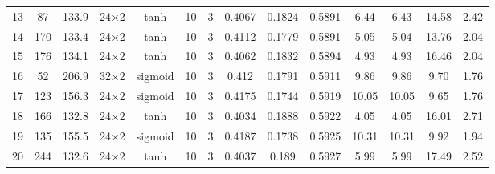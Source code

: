 \begin{tabular}{lcc cccc ccccccc}
  13 & 87 & 133.9 & 24$\times$2 & tanh & 10 & 3 & \num{0.4067} & \num{0.1824} & \num{0.5891} & 6.44 & 6.43 & 14.58 & 2.42 \\
  14 & 170 & 133.4 & 24$\times$2 & tanh & 10 & 3 & \num{0.4112} & \num{0.1779} & \num{0.5891} & 5.05 & 5.04 & 13.76 & 2.04 \\
  15 & 176 & 134.1 & 24$\times$2 & tanh & 10 & 3 & \num{0.4062} & \num{0.1832} & \num{0.5894} & 4.93 & 4.93 & 16.46 & 2.04 \\
  16 & 52 & 206.9 & 32$\times$2 & sigmoid & 10 & 3 & \num{0.412} & \num{0.1791} & \num{0.5911} & 9.86 & 9.86 & 9.70 & 1.76 \\
  17 & 123 & 156.3 & 24$\times$2 & sigmoid & 10 & 3 & \num{0.4175} & \num{0.1744} & \num{0.5919} & 10.05 & 10.05 & 9.65 & 1.76 \\
  18 & 166 & 132.8 & 24$\times$2 & tanh & 10 & 3 & \num{0.4034} & \num{0.1888} & \num{0.5922} & 4.05 & 4.05 & 16.01 & 2.71 \\
  19 & 135 & 155.5 & 24$\times$2 & sigmoid & 10 & 3 & \num{0.4187} & \num{0.1738} & \num{0.5925} & 10.31 & 10.31 & 9.92 & 1.94 \\
  20 & 244 & 132.6 & 24$\times$2 & tanh & 10 & 3 & \num{0.4037} & \num{0.189} & \num{0.5927} & 5.99 & 5.99 & 17.49 & 2.52 \\
\bottomrule
\end{tabular}
